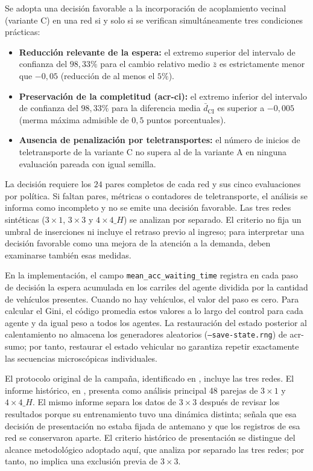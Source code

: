 Se adopta una decisión favorable a la incorporación de acoplamiento vecinal (variante C) en una red si y solo si se verifican simultáneamente tres condiciones prácticas:
\begin{itemize}
    \item \textbf{Reducción relevante de la espera:} el extremo superior del intervalo de confianza del $98{,}33\%$ para el cambio relativo medio $\bar{z}$ es estrictamente menor que $-0{,}05$ (reducción de al menos el $5\%$).
    \item \textbf{Preservación de la completitud (\acrshort{acr-ci}):} el extremo inferior del intervalo de confianza del $98{,}33\%$ para la diferencia media $\bar{d}_{\mathrm{CI}}$ es superior a $-0{,}005$ (merma máxima admisible de $0{,}5$ puntos porcentuales).
    \item \textbf{Ausencia de penalización por teletransportes:} el número de inicios de teletransporte de la variante C no supera al de la variante A en ninguna evaluación pareada con igual semilla.
\end{itemize}
La decisión requiere los $24$ pares completos de cada red y sus cinco evaluaciones por política. Si faltan pares, métricas o contadores de teletransporte, el análisis se informa como incompleto y no se emite una decisión favorable. Las tres redes sintéticas ($3\times1$, $3\times3$ y $4\times4\_H$) se analizan por separado. El criterio no fija un umbral de inserciones ni incluye el retraso previo al ingreso; para interpretar una decisión favorable como una mejora de la atención a la demanda, deben examinarse también esas medidas.

En la implementación, el campo \texttt{mean\_acc\_waiting\_time} registra en cada paso de decisión la espera acumulada en los carriles del agente dividida por la cantidad de vehículos presentes. Cuando no hay vehículos, el valor del paso es cero. Para calcular el Gini, el código promedia estos valores a lo largo del control para cada agente y da igual peso a todos los agentes. La restauración del estado posterior al calentamiento no almacena los generadores aleatorios (\texttt{--save-state.rng}) de \acrshort{acr-sumo}; por tanto, restaurar el estado vehicular no garantiza repetir exactamente las secuencias microscópicas individuales.

El protocolo original de la campaña, identificado en , incluye las tres redes. El informe histórico, en , presenta como análisis principal 48 parejas de $3\times1$ y $4\times4\_H$. El mismo informe separa los datos de $3\times3$ después de revisar los resultados porque su entrenamiento tuvo una dinámica distinta; señala que esa decisión de presentación no estaba fijada de antemano y que los registros de esa red se conservaron aparte. El criterio histórico de presentación se distingue del alcance metodológico adoptado aquí, que analiza por separado las tres redes; por tanto, no implica una exclusión previa de $3\times3$.

